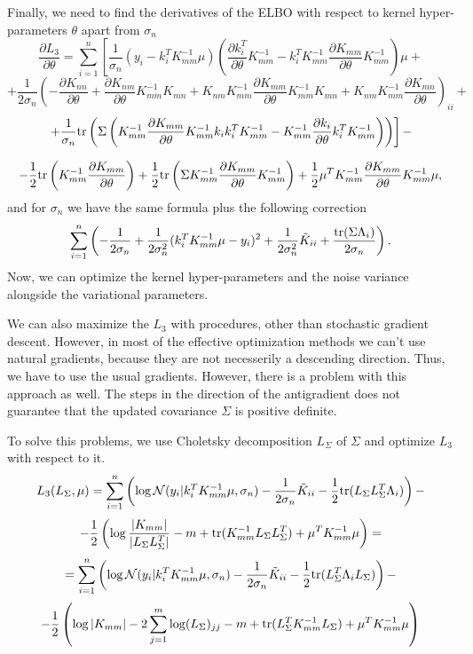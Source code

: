 \documentclass[12pt]{article}
\begin{document}
		Finally, we need to find the derivatives of the ELBO with respect to kernel hyper-parameters $\theta$ apart from $\sigma_n$
		$$\frac{\partial L_3} {\partial \theta} = \sum_{i = 1}^n \left [ \frac 1 {\sigma_n} (y_i - k_i^T K_{mm}^{-1} \mu) \left(\frac{\partial k_i^T}{\partial \theta} K_{mm}^{-1} - k_i^T K_{mm}^{-1} \frac{\partial K_{mm}}{\partial \theta} K_{mm}^{-1} \right)\mu + \right.$$
		$$\left. +\frac 1 {2 \sigma_n} \left (- \frac{\partial K_{nn}}{\partial \theta} +  \frac{\partial K_{nm}}{\partial \theta} K_{mm}^{-1} K_{mn} + K_{nm} K_{mm}^{-1} \frac{\partial K_{mm}}{\partial \theta} K_{mm}^{-1} K_{mn} + K_{nm} K_{mm}^{-1} \frac{\partial K_{mn}}{\partial \theta}\right)_ {ii} + \right.$$
		$$\left. +  \frac 1 {\sigma_n} \mbox{tr}\left( \Sigma \left( K_{mm}^{-1} \frac{\partial K_{mm}}{\partial \theta} K_{mm}^{-1} k_i k_i^T K_{mm}^{-1}  -  K_{mm}^{-1} \frac{\partial k_{i}}{\partial \theta}k_i^T K_{mm}^{-1}\right)\right)\right] - $$

		$$ - \frac 1 2 \mbox{tr}\left(K_{mm}^{-1} \frac{\partial K_{mm}}{\partial \theta}\right) + \frac 1 2 \mbox{tr}\left(\Sigma K_{mm}^{-1} \frac{\partial K_{mm}}{\partial \theta} K_{mm}^{-1} \right)+ \frac 1 2 \mu^T K_{mm}^{-1} \frac{\partial K_{mm}}{\partial \theta} K_{mm}^{-1}\mu,$$
		and for $\sigma_n$ we have the same formula plus the following correction
		$$\sum_{i = 1}^{n} \left(-\frac{1}{2\sigma_n} + \frac 1 {2 \sigma_n^2} (k_i^T K_{mm}^{-1} \mu - y_i)^2 + \frac 1 {2 \sigma_n^2} \tilde K_{ii} + \frac {\mbox{tr}(\Sigma \Lambda_i)}{2 \sigma_n}\right).$$
		Now, we can optimize the kernel hyper-parameters and the noise variance alongside the variational parameters. 
		
		We can also maximize the $L_3$ with procedures, other than stochastic gradient descent. However, in most of the effective optimization methods we can't use natural gradients, because they are not necesserily a descending direction. Thus, we have to use the usual gradients. However, there is a problem with this approach as well. The steps in the direction of the antigradient does not guarantee that the updated covariance $\Sigma$ is positive definite. 

		To solve this problems, we use Choletsky decomposition $L_{\Sigma}$ of $\Sigma$ and optimize $L_3$ with respect to it.
		$$L_3(L_{\Sigma}, \mu) = \sum_{i = 1}^{n} \left( \log \mathcal{N}(y_i | k_i^T K_{mm}^{-1} \mu, \sigma_n) - \frac 1 {2 \sigma_n} \tilde K_{ii} - \frac 1 2 \mbox{tr} (L_{\Sigma} L_{\Sigma}^T \Lambda_i) \right) - $$
		$$ -\frac 1 2 \left (\log \frac {|K_{mm}|} {|L_{\Sigma} L_{\Sigma}^T|} - m + \mbox{tr}(K_{mm}^{-1} L_{\Sigma} L_{\Sigma}^T) + \mu^T K_{mm}^{-1} \mu \right) = $$
		$$ = \sum_{i = 1}^{n} \left( \log \mathcal{N}(y_i | k_i^T K_{mm}^{-1} \mu, \sigma_n) - \frac 1 {2 \sigma_n} \tilde K_{ii} - \frac 1 2 \mbox{tr} (L_{\Sigma}^T \Lambda_iL_{\Sigma}) \right) - $$
		$$ -\frac 1 2 \left (\log |K_{mm}| - 2 \sum_{j=1}^{m}\log (L_{\Sigma})_{jj} - m + \mbox{tr}(L_{\Sigma}^T K_{mm}^{-1} L_{\Sigma}) + \mu^T K_{mm}^{-1} \mu \right)$$
\end{document}
